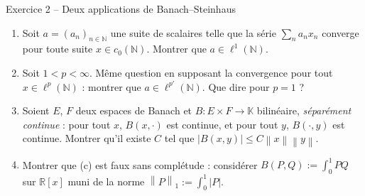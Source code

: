 \documentclass[11pt,a4paper]{article}
\newcommand{\R}{\mathbb{R}}
\newcommand{\N}{\mathbb{N}}
\newcommand{\K}{\mathbb{K}}
\newcommand{\norm}[1]{\left\|#1\right\|}
\theoremstyle{definition}
\begin{document}
\begin{exo}{Exercice 2 -- Deux applications de Banach--Steinhaus}
\begin{enumerate}[label=(\alph*)]
  \item Soit $a=(a_n)_{n\in\N}$ une suite de scalaires telle que la série $\sum_na_nx_n$ converge pour toute suite $x\in c_0(\N)$. Montrer que $a\in\ell^1(\N)$.
  \item Soit $1<p<\infty$. Même question en supposant la convergence pour tout $x\in\ell^p(\N)$ : montrer que $a\in\ell^{p'}(\N)$. Que dire pour $p=1$ ?
  \item Soient $E$, $F$ deux espaces de Banach et $B:E\times F\to\K$ bilinéaire, \emph{séparément continue} : pour tout $x$, $B(x,\cdot)$ est continue, et pour tout $y$, $B(\cdot,y)$ est continue. Montrer qu'il existe $C$ tel que $|B(x,y)|\le C\norm x\norm y$.
  \item Montrer que (c) est faux sans complétude : considérer $B(P,Q):=\int_0^1PQ$ sur $\R[x]$ muni de la norme $\norm P_1:=\int_0^1|P|$.
\end{enumerate}
\end{exo}
\end{document}
